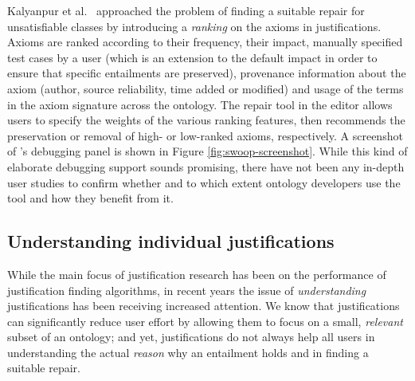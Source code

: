 \begin{figure}[tb]
\end{figure}

Kalyanpur et al.\ \cite{kalyanpur06bh} approached the problem of finding a suitable repair for unsatisfiable classes by introducing a \emph{ranking} on the axioms in justifications. Axioms are ranked according to their frequency, their impact, manually specified test cases by a user (which is an extension to the default impact in order to ensure that specific entailments are preserved), provenance information about the axiom (author, source reliability, time added or modified) and usage of the terms in the axiom signature across the ontology. The repair tool in the \swoop \cite{kalyanpur06sk} editor allows users to specify the weights of the various ranking features, then recommends the preservation or removal of high- or low-ranked axioms, respectively. A screenshot of \swoop's debugging panel is shown in Figure \ref{fig:swoop-screenshot}. While this kind of elaborate debugging support sounds promising, there have not been any in-depth user studies to confirm whether and to which extent ontology developers use the tool and how they benefit from it.

\subsection{Understanding individual justifications}
While the main focus of justification research has been on the performance of justification finding algorithms, in recent years the issue of \emph{understanding} justifications has been receiving increased attention. We know that justifications can significantly reduce user effort by allowing them to focus on a small, \emph{relevant} subset of an ontology; and yet, justifications do not always help all users in understanding the actual \emph{reason} why an entailment holds and in finding a suitable repair.

